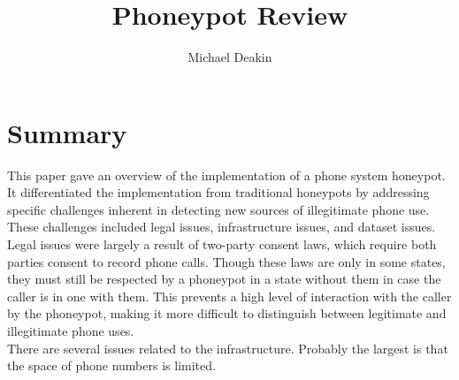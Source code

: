 \documentclass{article}
\title{Phoneypot Review}
\author{Michael Deakin}
\begin{document}
\maketitle
\section{Summary}
This paper gave an overview of the implementation of a phone system honeypot.
It differentiated the implementation from traditional honeypots by addressing specific challenges inherent in detecting new sources of illegitimate phone use.
These challenges included legal issues, infrastructure issues, and dataset issues.\\
Legal issues were largely a result of two-party consent laws, which require both parties consent to record phone calls.
Though these laws are only in some states, they must still be respected by a phoneypot in a state without them in case the caller is in one with them.
This prevents a high level of interaction with the caller by the phoneypot, making it more difficult to distinguish between legitimate and illegitimate phone uses.\\
There are several issues related to the infrastructure.
Probably the largest is that the space of phone numbers is limited.
\end{document}
